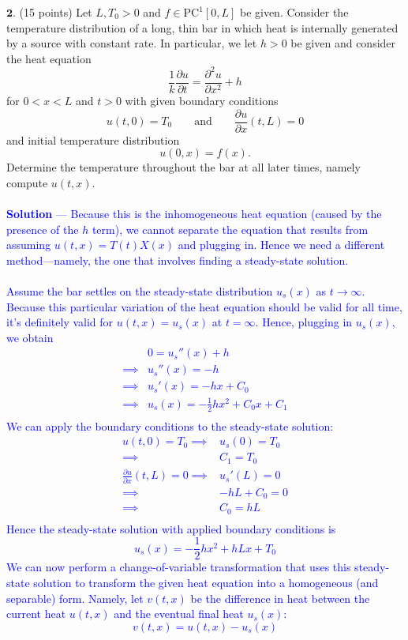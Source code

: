 \documentclass[12pt]{article}
\begin{document}
\noindent $\textbf{2}$. (15 points)  Let $L, T_0 > 0$ and $f \in \mathrm{PC}^1[0,L]$ be given. Consider the temperature distribution of a long, thin bar in which heat is internally generated by a source with constant rate.
In particular, we let $h > 0$ be given and consider the heat equation
$$\frac{1}{k}\frac{\partial u}{\partial t} = \frac{\partial^2 u}{\partial x^2} + h$$ 
for $0 < x < L$ and $t > 0$ 
with given boundary conditions
$$u(t, 0) = T_0 \qquad \mathrm{and} \qquad \frac{\partial u}{\partial x}(t, L) = 0$$
and initial temperature distribution
$$u(0,x) = f(x).$$
Determine the temperature throughout the bar at all later times, namely compute $u(t,x)$. \\ \\
\textcolor{blue}{\textbf{Solution} — Because this is the inhomogeneous heat equation (caused by the presence of the $h$ term), we cannot separate the equation that results from assuming $u(t,x) = T(t)X(x)$ and plugging in. Hence we need a different method—namely, the one that involves finding a steady-state solution. \\ \\ Assume the bar settles on the steady-state distribution $u_s(x)$ as $t \to \infty$. Because this particular variation of the heat equation should be valid for all time, it's definitely valid for $u(t,x) = u_s(x)$ at $t = \infty$. Hence, plugging in $u_s(x)$, we obtain
\begin{align*}
&0 = u_s''(x) + h \\
\implies& u_s''(x) = -h\\
\implies& u_s'(x) = -hx + C_0\\
\implies& u_s(x) = -\frac{1}{2} hx^2 + C_0 x + C_1\\
\end{align*}
We can apply the boundary conditions to the steady-state solution:
\begin{align*}
u(t,0) = T_0 \implies& u_s(0) = T_0 \\
\implies& C_1 = T_0 \\
\frac{\partial u}{\partial x}(t, L) = 0 \implies& u_s'(L) = 0 \\
\implies& -hL + C_0 = 0 \\
\implies& C_0 = hL \\
\end{align*}
Hence the steady-state solution with applied boundary conditions is $$u_s(x) = -\frac{1}{2} h x^2 + hLx + T_0$$ We can now perform a change-of-variable transformation that uses this steady-state solution to transform the given heat equation into a homogeneous (and separable) form. Namely, let $v(t,x)$ be the difference in heat between the current heat $u(t,x)$ and the eventual final heat $u_s(x)$: $$v(t,x) = u(t,x) - u_s(x)$$
}
\end{document}

